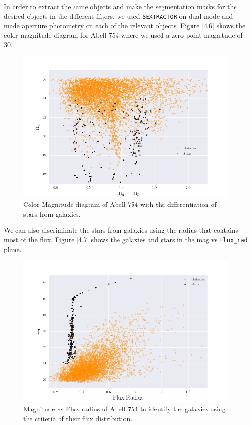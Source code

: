 In order to extract the same objects and make the segmentation masks for the desired objects in the different filters, we used \texttt{SEXTRACTOR} on dual mode and made aperture photometry on each of the relevant objects. Figure [4.6] shows the color magnitude diagram for Abell 754 where we used a zero point magnitude of 30.

\begin{figure}[H]
\centering
\includegraphics[width=12cm]{images/color_mag.png}
\caption[Color Magnitude diagram of Abell 754]{Color Magnitude diagram of Abell 754 with the differentiation of stars from galaxies.}
\end{figure}

We can also discriminate the stars from galaxies using the radius that contains most of the flux. Figure [4.7] shows the galaxies and stars in the mag vs \texttt{Flux\_rad} plane.

\begin{figure}[H]
\centering
\includegraphics[width=12cm]{images/mag_vs_flux_rad.png}
\caption[Magnitude vs Flux radius of Abell 754]{Magnitude vs Flux radius of Abell 754 to identify the galaxies using the criteria of their flux distribution.}
\end{figure}

